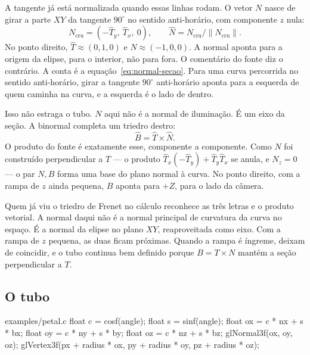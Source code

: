 \documentclass[11pt,a4paper]{article}
\begin{document}
A tangente já está normalizada quando essas linhas rodam. O vetor \(N\) nasce de girar a parte \(XY\) da tangente \(90^\circ\) no sentido anti-horário, com componente \(z\) nula:
\begin{equation}
  N_{\text{cru}} = (-\hat T_y,\ \hat T_x,\ 0),
  \qquad
  \hat N = N_{\text{cru}} / \|N_{\text{cru}}\|.
  \label{eq:normal-secao}
\end{equation}
No ponto direito, \(\hat T \approx (0, 1, 0)\) e \(\hat N \approx (-1, 0, 0)\). A normal aponta para a origem da elipse, para o interior, não para fora. O comentário do fonte diz o contrário. A conta é a equação~\eqref{eq:normal-secao}. Para uma curva percorrida no sentido anti-horário, girar a tangente \(90^\circ\) anti-horário aponta para a esquerda de quem caminha na curva, e a esquerda é o lado de dentro.

Isso não estraga o tubo. \(N\) aqui não é a normal de iluminação. É um eixo da seção. A binormal completa um triedro destro:
\begin{equation}
  \hat B = \hat T \times \hat N .
  \label{eq:binormal}
\end{equation}
O produto do fonte é exatamente esse, componente a componente. Como \(N\) foi construído perpendicular a \(T\) --- o produto \(\hat T_x (-\hat T_y) + \hat T_y \hat T_x\) se anula, e \(N_z = 0\) --- o par \(N, B\) forma uma base do plano normal à curva. No ponto direito, com a rampa de \(z\) ainda pequena, \(B\) aponta para \(+Z\), para o lado da câmera.

Quem já viu o triedro de Frenet no cálculo reconhece as três letras e o produto vetorial. A normal daqui não é a normal principal de curvatura da curva no espaço. É a normal da elipse no plano \(XY\), reaproveitada como eixo. Com a rampa de \(z\) pequena, as duas ficam próximas. Quando a rampa é íngreme, deixam de coincidir, e o tubo continua bem definido porque \(B = T \times N\) mantém a seção perpendicular a \(T\).

\subsection{O tubo}

\begin{codigo}{examples/petal.c}
float c = cosf(angle);
float s = sinf(angle);
float ox = c * nx + s * bx;
float oy = c * ny + s * by;
float oz = c * nz + s * bz;
glNormal3f(ox, oy, oz);
glVertex3f(px + radius * ox, py + radius * oy, pz + radius * oz);
\end{codigo}
\end{document}
